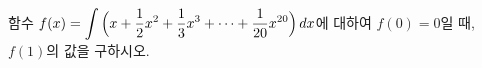 함수 $f(x)=\displaystyle\int\Big(x+\dfrac{1}{2}x^2+\dfrac{1}{3}x^3+\cdots+\dfrac{1}{20}x^{20}\Big)\mkern3mu dx$에 대하여 $f(0)=0$일 때, $f(1)$의 값을 구하시오.

